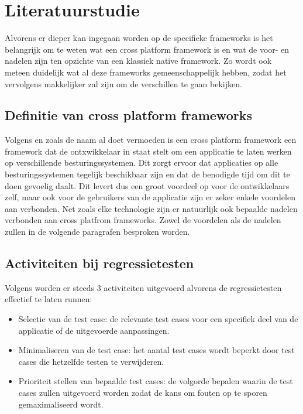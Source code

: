 \section{Literatuurstudie}
\label{sec:literatuurstudie}

Alvorens er dieper kan ingegaan worden op de specifieke frameworks is het belangrijk om te weten wat een cross platform framework is en wat de voor- en nadelen zijn ten opzichte van een klassiek native framework. Zo wordt ook meteen duidelijk wat al deze frameworks gemeenschappelijk hebben, zodat het vervolgens makkelijker zal zijn om de verschillen te gaan bekijken.

\subsection{Definitie van cross platform frameworks}

Volgens \textcite{El-Kassas2014} en zoals de naam al doet vermoeden is een cross platform framework een framework dat de ontxwikkelaar in staat stelt om een applicatie te laten werken op verschillende besturingssystemen. Dit zorgt ervoor dat applicaties op alle besturingssystemen tegelijk beschikbaar zijn en dat de benodigde tijd om dit te doen gevoelig daalt. Dit levert dus een groot voordeel op voor de ontwikkelaars zelf, maar ook voor de gebruikers van de applicatie zijn er zeker enkele voordelen aan verbonden. Net zoals elke technologie zijn er natuurlijk ook bepaalde nadelen verbonden aan cross platfrom frameworks. Zowel de voordelen als de nadelen zullen in de volgende paragrafen besproken worden.

\subsection{Activiteiten bij regressietesten}

Volgens  \textcite{AhlamAnsari2016} worden er steeds 3 activiteiten uitgevoerd alvorens de regressietesten effectief te laten runnen:

\begin{itemize}
    \item Selectie van de test case: de relevante test cases voor een specifiek deel van de applicatie of de uitgevoerde aanpassingen.
    \item Minimaliseren van de test case: het aantal test cases wordt beperkt door test cases die hetzelfde testen te verwijderen. 
    \item Prioriteit stellen van bepaalde test cases: de volgorde bepalen waarin de test cases zullen uitgevoerd worden zodat de kans om fouten op te sporen gemaximaliseerd wordt.
\end{itemize}

